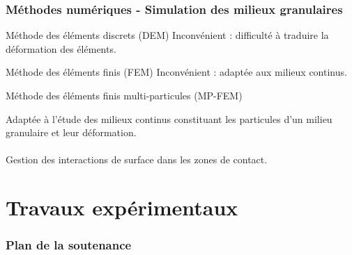 \documentclass[8pt]{beamer}
\begin{document}
\begin{frame}
	\frametitle{Méthodes numériques - Simulation des milieux granulaires}
	\vfill
	\begin{block}{Méthode des éléments discrets (DEM)}
		Inconvénient : difficulté à traduire la déformation des éléments.	
	\end{block}\vfill
	\begin{block}{Méthode des éléments finis (FEM)}
		Inconvénient : adaptée aux milieux continus.
	\end{block}\vfill
	\begin{block}{Méthode des éléments finis multi-particules (MP-FEM)}
	\begin{minipage}[c]{.49\textwidth}
	Adaptée à l'étude des milieux continus constituant les particules d'un milieu granulaire et leur déformation.\\
	\null\\
	Gestion des interactions de surface dans les zones de contact.\\
	\end{minipage}
	\begin{minipage}[c]{.49\textwidth}\centering
	\end{minipage}
	\end{block}
	\vfill
\end{frame}

\section[Travaux expérimentaux]{Travaux expérimentaux}
\begin{frame}
	\frametitle{Plan de la soutenance}
	\tableofcontents[currentsection]
\end{frame}
\end{document}
